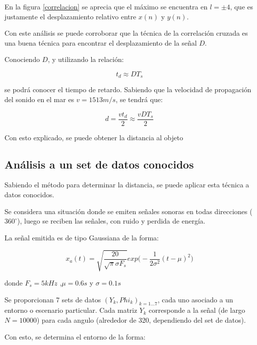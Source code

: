 \documentclass[letterpaper,11pt]{article}
\begin{document}
En la figura \ref{correlacion} se aprecia que el máximo se encuentra en $l = \pm 4$, que es justamente el desplazamiento relativo entre $x(n)$ y $y(n)$.

Con este análisis se puede corroborar que la técnica de la correlación cruzada es una buena técnica para encontrar el desplazamiento de la señal $D$.\par

Conociendo $D$, y utilizando la relación:

\begin{equation}
t_{d}\approx DT_{s}
\end{equation}

se podrá conocer el tiempo de retardo. Sabiendo que la velocidad de propagación del sonido en el mar es $ v = 1513 m/s$, se tendrá que:

\begin{equation}
d = \frac{vt_{d}}{2} \approx \frac{vDT_{s}}{2}
\end{equation}

Con esto explicado, se puede obtener la distancia al objeto

\subsection{Análisis a un set de datos conocidos}

Sabiendo el método para determinar la distancia, se puede aplicar esta técnica a datos conocidos. \par

Se considera una situación donde se emiten señales sonoras en todas direcciones ($360^{\circ}$), luego se reciben las señales, con ruido y perdida de energía.

La señal emitida es de tipo Gaussiana de la forma:

\begin{equation}
x_{a}(t) = \sqrt{\frac{20}{\sqrt{\pi}\sigma F_{s}}} exp\Bigg( -\frac{1}{2\sigma^2}(t-\mu)^2 \Bigg)
\end{equation}

donde $F_{s} = 5 kHz$ ,$\mu = 0.6s$ y $\sigma = 0.1s$

Se proporcionan 7 sets de datos $(Y_{k},Phi_{k})_{k=1...7}$, cada uno asociado a un entorno o escenario particular. Cada matriz $Y_{k}$ corresponde a la señal (de largo $N =10000$) para cada angulo (alrededor de 320, dependiendo del set de datos).\par

Con esto, se determina el entorno de la forma:
\end{document}
